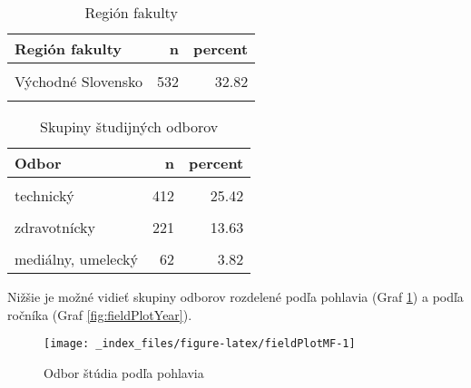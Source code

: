 \documentclass[
]{article}
\begin{document}
\begin{table}[H]

\caption{\label{tab:regFieldTab}Región fakulty}
\centering
\fontsize{10}{12}\selectfont
\begin{tabular}[t]{lrr}
\toprule
Región fakulty & n & percent\\
\midrule
\cellcolor{gray!6}{Západné Slovensko} & \cellcolor{gray!6}{761} & \cellcolor{gray!6}{46.95}\\
Východné Slovensko & 532 & 32.82\\
\cellcolor{gray!6}{Stredné Slovensko} & \cellcolor{gray!6}{328} & \cellcolor{gray!6}{20.23}\\
\bottomrule
\end{tabular}
\end{table}

\begin{table}[H]

\caption{\label{tab:fieldStudyTab}Skupiny študijných odborov}
\centering
\fontsize{10}{12}\selectfont
\begin{tabular}[t]{lrr}
\toprule
Odbor & n & percent\\
\midrule
\cellcolor{gray!6}{spoločenský, ekonomický, právny} & \cellcolor{gray!6}{505} & \cellcolor{gray!6}{31.15}\\
technický & 412 & 25.42\\
\cellcolor{gray!6}{filozofický, humanitný, pedagogický, teologický} & \cellcolor{gray!6}{351} & \cellcolor{gray!6}{21.65}\\
zdravotnícky & 221 & 13.63\\
\cellcolor{gray!6}{prírodovedecký} & \cellcolor{gray!6}{70} & \cellcolor{gray!6}{4.32}\\
\addlinespace
mediálny, umelecký & 62 & 3.82\\
\bottomrule
\end{tabular}
\end{table}

Nižšie je možné vidieť skupiny odborov rozdelené podľa pohlavia (Graf \ref{fig:fieldPlotMF}) a podľa ročníka (Graf \ref{fig:fieldPlotYear}).

\begin{figure}

{\centering \texttt{[image: \_index\_files/figure-latex/fieldPlotMF-1]} 

}

\caption{Odbor štúdia podľa pohlavia}\label{fig:fieldPlotMF}
\end{figure}
\end{document}
